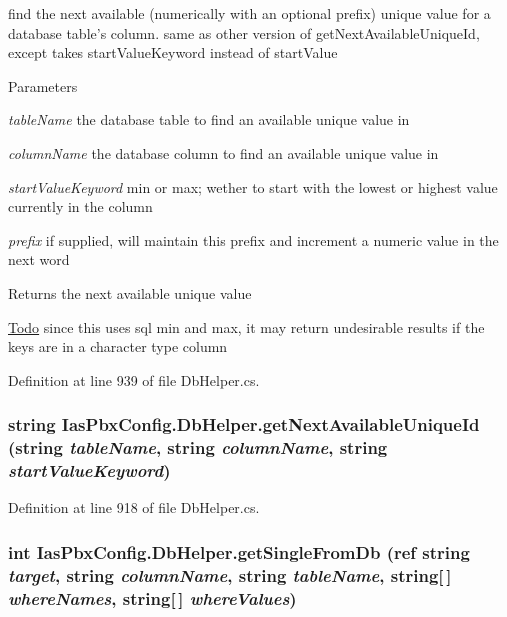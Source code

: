 find the next available (numerically with an optional prefix) unique value for a database table's column. same as other version of getNextAvailableUniqueId, except takes startValueKeyword instead of startValue


\begin{DoxyParams}{Parameters}
\item[{\em tableName}]the database table to find an available unique value in \item[{\em columnName}]the database column to find an available unique value in \item[{\em startValueKeyword}]min or max; wether to start with the lowest or highest value currently in the column \item[{\em prefix}]if supplied, will maintain this prefix and increment a numeric value in the next word \end{DoxyParams}
\begin{DoxyReturn}{Returns}
the next available unique value 
\end{DoxyReturn}
\begin{Desc}
\item[\hyperlink{todo__todo000024}{Todo}]since this uses sql min and max, it may return undesirable results if the keys are in a character type column \end{Desc}


Definition at line 939 of file DbHelper.cs.\hypertarget{class_ias_pbx_config_1_1_db_helper_a52df15fe3a440e493b8a082995f9c246}{
\subsubsection[{getNextAvailableUniqueId}]{\setlength{\rightskip}{0pt plus 5cm}string IasPbxConfig.DbHelper.getNextAvailableUniqueId (string {\em tableName}, \/  string {\em columnName}, \/  string {\em startValueKeyword})}}
\label{class_ias_pbx_config_1_1_db_helper_a52df15fe3a440e493b8a082995f9c246}


Definition at line 918 of file DbHelper.cs.\hypertarget{class_ias_pbx_config_1_1_db_helper_afee22408d70a9c0f496b8f2957f19379}{
\subsubsection[{getSingleFromDb}]{\setlength{\rightskip}{0pt plus 5cm}int IasPbxConfig.DbHelper.getSingleFromDb (ref string {\em target}, \/  string {\em columnName}, \/  string {\em tableName}, \/  string\mbox{[}$\,$\mbox{]} {\em whereNames}, \/  string\mbox{[}$\,$\mbox{]} {\em whereValues})}}
\label{class_ias_pbx_config_1_1_db_helper_afee22408d70a9c0f496b8f2957f19379}



